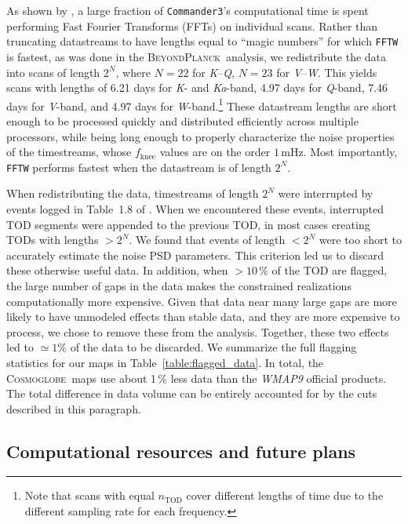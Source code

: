 \documentclass[twocolumn]{../../common/aa}
\def\commanderthree{\texttt{Commander3}}
\newcommand{\bp}{\textsc{BeyondPlanck}}
\newcommand{\Cosmoglobe}{\textsc{Cosmoglobe}}
\newcommand{\K}[0]{\textit K}
\newcommand{\Ka}[0]{\textit{Ka}}
\newcommand{\Q}[0]{\textit Q}
\newcommand{\V}[0]{\textit V}
\newcommand{\W}[0]{\textit W}
\begin{document}
As shown by \citet{bp03}, a large fraction of \commanderthree's computational time is spent performing Fast Fourier Transforms (FFTs) on individual scans. Rather than truncating datastreams to have lengths equal to ``magic numbers'' for which \texttt{FFTW} \citep{FFTW05} is fastest, as was done in the \bp\ analysis, 
we redistribute the data into scans of length $2^N$, where $N=22$ for \K--\Q, $N=23$ for \V--\W. This yields scans with lengths of 6.21 days for \K- and \Ka-band, 4.97 days for \Q-band, 7.46 days for \V-band, and 4.97 days for \W-band.\footnote{Note that scans with equal $n_\mathrm{TOD}$ cover different lengths of time due to the different sampling rate for each frequency.}
These datastream lengths are short enough to be processed quickly and distributed efficiently across multiple processors, while being long enough to properly characterize the noise properties of the timestreams, whose $f_\mathrm{knee}$ values are on the order $1\,\mathrm{mHz}$. Most importantly, \texttt{FFTW} performs fastest when the datastream is of length $2^N$. 

When redistributing the data, timestreams of length $2^N$ were interrupted by events logged in Table~1.8 of \citet{wmapexsupp}.
When we encountered these events, interrupted TOD segments were appended to the previous TOD, in most cases creating TODs with lengths $>2^N$. We found that events of length $<2^N$ were too short to accurately estimate the noise PSD parameters. This criterion led us to discard these otherwise useful data. In addition, when $>10\,\%$ of the TOD are flagged, the large number of gaps in the data makes the constrained realizations computationally more expensive. Given that data near many large gaps are more likely to have unmodeled effects than stable data, and they are more expensive to process, we chose to remove these from the analysis. Together, these two effects led to $\simeq1\%$ of the data to be discarded. We summarize the full flagging statistics for our maps in Table~\ref{table:flagged_data}. In total, the \Cosmoglobe\ maps use about 1\,\% less data than the \textit{WMAP9} official products. The total difference in data volume can be entirely accounted for by the cuts described in this paragraph.





\subsection{Computational resources and future plans}
\label{sec:resources}
\end{document}
